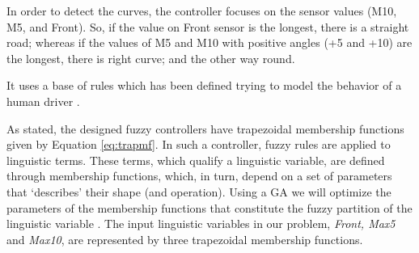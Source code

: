 \documentclass[conference]{IEEEtran}
\begin{document}
In order to detect the curves, the controller focuses on the sensor values (M10, M5, and Front). So, if the value on Front sensor is the longest, there is a straight road; whereas if the values of M5 and M10 with positive angles (+5 and +10) are the longest, there is right curve; and the other way round.

It uses a base of rules which has been defined trying to model the behavior of a human driver \cite{salem_evo17}.






As stated, the designed fuzzy controllers have trapezoidal membership functions given by Equation \ref{eq:trapmf}.
In such a controller, fuzzy rules are applied to linguistic
terms. These terms, which qualify a linguistic variable, are defined
through membership functions, which, in turn, depend on a set of
parameters that `describes' their shape (and operation). Using a GA we
will optimize the parameters of the membership functions that
constitute the fuzzy partition of the linguistic variable
\cite{ThangG08}. The input linguistic variables in our problem,
\textit{Front, Max5} and \textit{Max10}, are represented by three
trapezoidal membership functions. 
\end{document}
